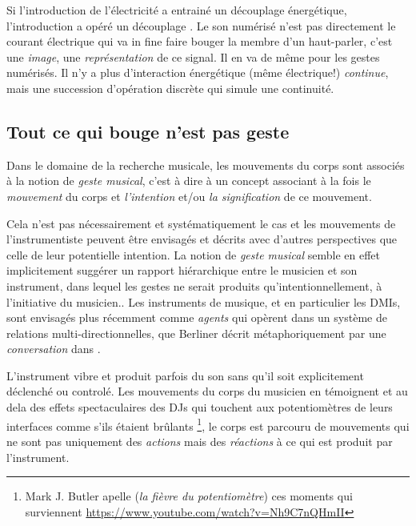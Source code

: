 Si l'introduction de l'électricité a entrainé un découplage énergétique, l'introduction a opéré un découplage . Le son numérisé n'est pas directement le courant électrique qui va in fine faire bouger la membre d'un haut-parler, c'est une \textit{image}, une \textit{représentation} de ce signal. Il en va de même pour les gestes numérisés. Il n'y a plus d'interaction énergétique (même électrique!) \textit{continue}, mais une succession d'opération discrète qui simule une continuité. 


\subsection{Tout ce qui bouge n'est pas geste}

Dans le domaine de la recherche musicale, les mouvements du corps sont associés à la notion de \textit{geste musical}, c'est à dire à un concept associant à la fois le \textit{mouvement} du corps et \textit{l'intention} et/ou \textit{la signification} de ce mouvement. 

Cela n'est pas nécessairement et systématiquement le cas et les mouvements de l'instrumentiste peuvent être envisagés et décrits avec d'autres perspectives que celle de leur potentielle intention.  La notion de \textit{geste musical} semble en effet implicitement suggérer un rapport hiérarchique entre le musicien et son instrument, dans lequel les gestes ne serait produits qu'intentionnellement, à l'initiative du musicien.. Les instruments de musique, et en particulier les DMIs, sont envisagés plus récemment comme \textit{agents} qui opèrent dans un système de relations multi-directionnelles, que Berliner décrit métaphoriquement par une \textit{conversation} dans \cite{berliner_thinking_2009}.  


L'instrument vibre et produit parfois du son sans qu'il soit explicitement déclenché ou controlé. Les mouvements du corps du musicien en témoignent et au dela des effets spectaculaires des DJs qui touchent aux potentiomètres de leurs interfaces comme s'ils étaient brûlants \footnote{Mark J. Butler apelle  (\textit{la fièvre du potentiomètre}) ces moments qui surviennent  \cite{butler_playing_2014} \url{https://www.youtube.com/watch?v=Nh9C7nQHmII}}, le corps est parcouru de mouvements qui ne sont pas uniquement des \textit{actions} mais des \textit{réactions} à ce qui est produit par l'instrument. 

